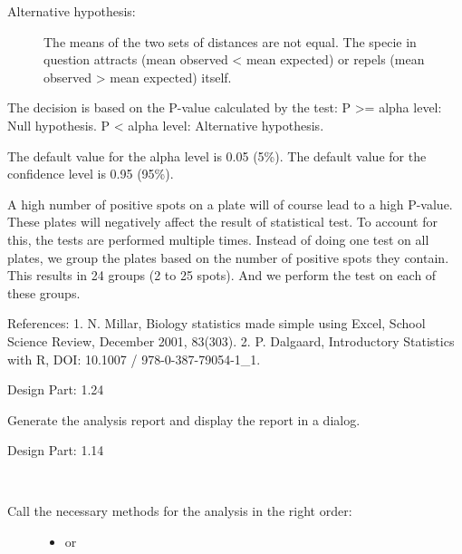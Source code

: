 \documentclass[letterpaper,10pt,english]{sphinxmanual}
\begin{document}
\begin{fulllineitems}
\begin{fulllineitems}
\begin{description}
\item[{Alternative hypothesis:}] \leavevmode
The means of the two sets of distances
are not equal. The specie in question attracts (mean
observed \textless{} mean expected) or repels (mean observed \textgreater{}
mean expected) itself.

\end{description}

The decision is based on the P-value calculated by the test:
P \textgreater{}= alpha level: Null hypothesis.
P \textless{} alpha level: Alternative hypothesis.

The default value for the alpha level is 0.05 (5\%).
The default value for the confidence level is 0.95 (95\%).

A high number of positive spots on a plate will of course lead
to a high P-value. These plates will negatively affect the
result of statistical test. To account for this, the tests
are performed multiple times. Instead of doing one test on all
plates, we group the plates based on the number of positive spots
they contain. This results in 24 groups (2 to 25 spots). And we
perform the test on each of these groups.

References:
1. N. Millar, Biology statistics made simple using Excel, School Science Review, December 2001, 83(303).
2. P. Dalgaard, Introductory Statistics with R, DOI: 10.1007 / 978-0-387-79054-1\_1.

Design Part: 1.24

\end{fulllineitems}


\begin{fulllineitems}
\label{setlyze/analysis/attraction_intra:setlyze.analysis.attraction_intra.Start.generate_report}
Generate the analysis report and display the report in a
dialog.

Design Part: 1.14

\end{fulllineitems}


\begin{fulllineitems}
\label{setlyze/analysis/attraction_intra:setlyze.analysis.attraction_intra.Start.run}~\begin{description}
\item[{Call the necessary methods for the analysis in the right order:}] \leavevmode\begin{itemize}
\item {} 
{\hyperref[setlyze/database:setlyze.database.AccessLocalDB.get_record_ids]{}} or


\end{itemize}
\end{description}
\end{fulllineitems}
\end{fulllineitems}
\end{document}
